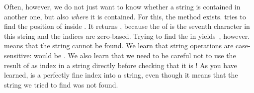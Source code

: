 Often, however, we do not just want to know whether a string is contained in another one, but also \emph{where} it is contained.
For this, the  method exists.
 tries to find the position of  inside .
It returns , because the  of  is the seventh character in this string and the indices are zero-based.
Trying to find the  in  yields~, however.
 means that the string cannot be found.
We learn that string operations are case-sensitive:
 would be .
We also learn that we need to be careful not to use the result of  as index in a string directly before checking that it is !
As you have learned,  is a perfectly fine index into a string, even though it means that the string we tried to find was not found.

